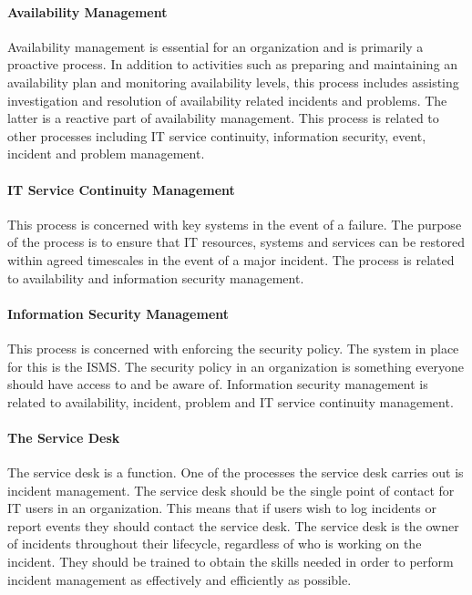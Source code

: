 \paragraph{Availability Management}
Availability management is essential for an organization and is primarily a proactive process. In addition to activities such as preparing and maintaining an availability plan and monitoring availability levels, this process includes assisting investigation and resolution of availability related incidents and problems. The latter is a reactive part of availability management. This process is related to other processes including IT service continuity, information security, event, incident and problem management.

\paragraph{IT Service Continuity Management}
This process is concerned with key systems in the event of a failure. The purpose of the process is to ensure that IT resources, systems and services can be restored within agreed timescales in the event of a major incident. The process is related to availability and information security management.

\paragraph{Information Security Management}
This process is concerned with enforcing the security policy. The system in place for this is the \ac{ISMS}. The security policy in an organization is something everyone should have access to and be aware of. Information security management is related to availability, incident, problem and IT service continuity management. 

\paragraph{The Service Desk}
The service desk is a function. One of the processes the service desk carries out is incident management. The service desk should be the single point of contact for IT users in an organization. This means that if users wish to log incidents or report events they should contact the service desk. The service desk is the owner of incidents throughout their lifecycle, regardless of who is working on the incident. They should be trained to obtain the skills needed in order to perform incident management as effectively and efficiently as possible.

